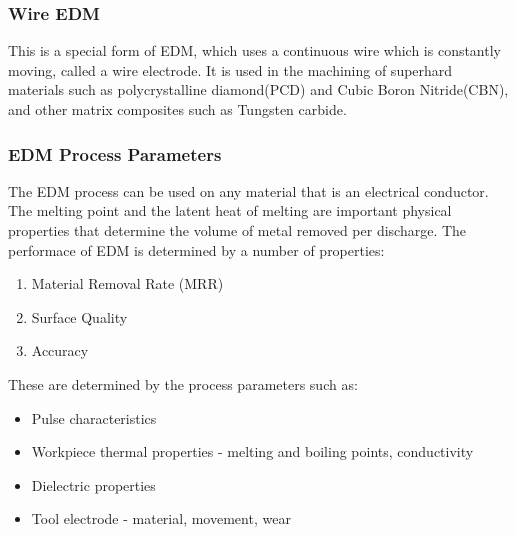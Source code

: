 \subsubsection{Wire EDM}
This is a special form of EDM, which uses a continuous wire which is constantly moving, called a wire electrode. It is used in the machining of superhard materials such as polycrystalline diamond(PCD) and Cubic Boron Nitride(CBN), and other matrix composites such as Tungsten carbide.

\subsubsection{EDM Process Parameters}
The EDM process can be used on any material that is an electrical conductor. The melting point and the latent heat of melting are important physical properties that determine the volume of metal removed per discharge.
The performace of EDM is determined by a number of properties\cite{youssef2020non}:
\begin{enumerate}
	\item Material Removal Rate (MRR)
	\item Surface Quality
	\item Accuracy
\end{enumerate}
These are determined by the process parameters such as:
\begin{itemize}
	\item Pulse characteristics
	\item Workpiece thermal properties - melting and boiling points, conductivity
	\item Dielectric properties
	\item Tool electrode - material, movement, wear
\end{itemize}

